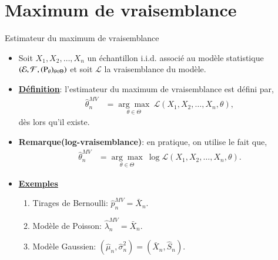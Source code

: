 \section{Maximum de vraisemblance}
\frame{\sectionpage}

\begin{frame}[allowframebreaks]{Estimateur du maximum de vraisemblance}
    \begin{itemize}
        \item Soit $X_1, X_2, \ldots, X_n$ un échantillon i.i.d. associé au modèle statistique 
        $\left(\mathcal{E}, \mathcal{F}, (\operatorname{P}_\theta)_{\theta\in\Theta}\right)$ et soit $\mathcal{L}$
        la vraisemblance du modèle.
        \item \textbf{\underline{Définition}}: l'estimateur du maximum de vraisemblance est défini par, 
        \begin{align*}
            \hat{\theta}^{MV}_n &=\underset{\theta\in \Theta}{\arg\max} \ \mathcal{L}(X_1, X_2, 
            \ldots, X_n, \theta),
        \end{align*}
        dès lors qu'il existe.
        \item \textbf{Remarque(log-vraisemblance)}: en pratique, on utilise le fait que,
        \begin{align*}
            \hat{\theta}^{MV}_n &=\underset{\theta\in \Theta}{\arg\max} \ \log \mathcal{L}(X_1, X_2, 
            \ldots, X_n, \theta).
        \end{align*}
        \framebreak
        \item \textbf{\underline{Exemples}}
        \begin{enumerate}[-]
            \item Tirages de Bernoulli: $\hat{p}_n^{MV} = \bar{X}_n$.
            \item Modèle de Poisson: $\hat{\lambda}_n^{MV} = \bar{X}_n$.
            \item Modèle Gaussien: $(\hat{\mu}_n, \hat{\sigma}_n^2) = (\bar{X}_n, \hat{S}_n)$.
        \end{enumerate}
    \end{itemize}
\end{frame}
